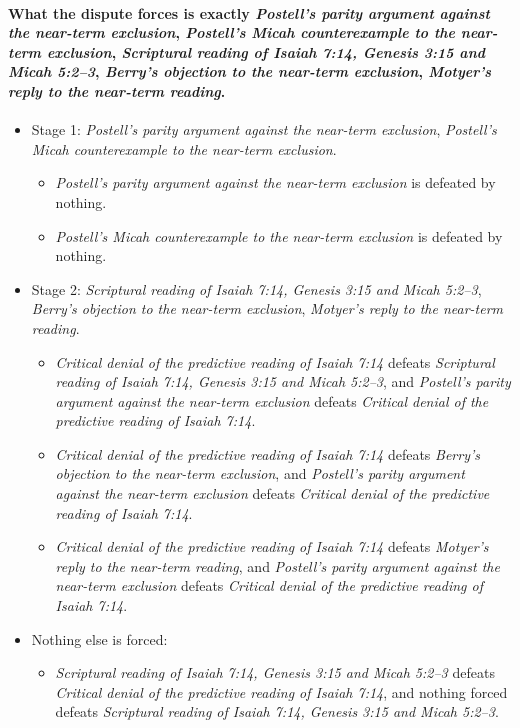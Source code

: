 \documentclass[11pt]{article}
\begin{document}
\paragraph{What the dispute forces is exactly \emph{Postell's parity argument against the near-term exclusion}, \emph{Postell's Micah counterexample to the near-term exclusion}, \emph{Scriptural reading of Isaiah 7:14, Genesis 3:15 and Micah 5:2–3}, \emph{Berry's objection to the near-term exclusion}, \emph{Motyer's reply to the near-term reading}.}
\begin{itemize}
\item Stage 1: \emph{Postell's parity argument against the near-term exclusion}, \emph{Postell's Micah counterexample to the near-term exclusion}.
\begin{itemize}
\item \emph{Postell's parity argument against the near-term exclusion} is defeated by nothing.
\item \emph{Postell's Micah counterexample to the near-term exclusion} is defeated by nothing.
\end{itemize}
\item Stage 2: \emph{Scriptural reading of Isaiah 7:14, Genesis 3:15 and Micah 5:2–3}, \emph{Berry's objection to the near-term exclusion}, \emph{Motyer's reply to the near-term reading}.
\begin{itemize}
\item \emph{Critical denial of the predictive reading of Isaiah 7:14} defeats \emph{Scriptural reading of Isaiah 7:14, Genesis 3:15 and Micah 5:2–3}, and \emph{Postell's parity argument against the near-term exclusion} defeats \emph{Critical denial of the predictive reading of Isaiah 7:14}.
\item \emph{Critical denial of the predictive reading of Isaiah 7:14} defeats \emph{Berry's objection to the near-term exclusion}, and \emph{Postell's parity argument against the near-term exclusion} defeats \emph{Critical denial of the predictive reading of Isaiah 7:14}.
\item \emph{Critical denial of the predictive reading of Isaiah 7:14} defeats \emph{Motyer's reply to the near-term reading}, and \emph{Postell's parity argument against the near-term exclusion} defeats \emph{Critical denial of the predictive reading of Isaiah 7:14}.
\end{itemize}
\item Nothing else is forced:
\begin{itemize}
\item \emph{Scriptural reading of Isaiah 7:14, Genesis 3:15 and Micah 5:2–3} defeats \emph{Critical denial of the predictive reading of Isaiah 7:14}, and nothing forced defeats \emph{Scriptural reading of Isaiah 7:14, Genesis 3:15 and Micah 5:2–3}.
\end{itemize}
\end{itemize}
\end{document}
